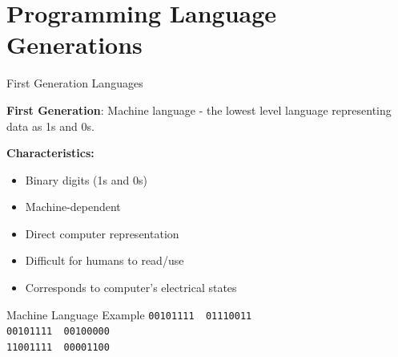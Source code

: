 \documentclass[aspectratio=169]{beamer}
\begin{document}
\section{Programming Language Generations}

\begin{frame}{First Generation Languages}
    \begin{definition}
        \textbf{First Generation}: Machine language - the lowest level language representing data as 1s and 0s.
    \end{definition}
    
    \vspace{0.3cm}
    \textbf{Characteristics:}
    \begin{itemize}
        \item Binary digits (1s and 0s)
        \item Machine-dependent
        \item Direct computer representation
        \item Difficult for humans to read/use
        \item Corresponds to computer's electrical states
    \end{itemize}
    
    \begin{exampleblock}{Machine Language Example}
        \texttt{00101111\ \ 01110011}\\
        \texttt{00101111\ \ 00100000}\\
        \texttt{11001111\ \ 00001100}
    \end{exampleblock}
\end{frame}
\end{document}
